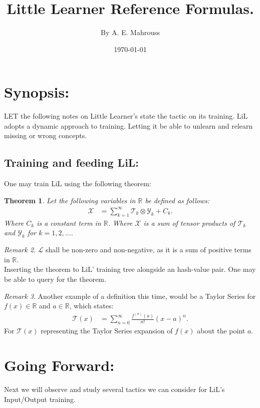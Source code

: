 \documentclass[10pt]{article}
\title{%
	\vspace{-1.5em}%
	\large\textbf{Little Learner Reference Formulas.}%
}
\author{By A. E. Mahrouss}
\date{\today}
\theoremstyle{plain}
\newtheorem{theorem}{Theorem}[section]
\theoremstyle{definition}
\theoremstyle{remark}
\newtheorem{remark}[theorem]{Remark}
\begin{document}

\maketitle
\tableofcontents
\newpage

\section{Synopsis:}

\lettrine[lines=1, lhang=0.1, loversize=0.2]{L}ET the following notes on Little Learner's state the tactic on its training. LiL adopts a dynamic approach to training. Letting it be able to unlearn and relearn missing or wrong concepts.

\subsection{Training and feeding LiL:}

One may train LiL using the following theorem:

\begin{theorem}
Let the following variables in $\mathbb{R}$ be defined as follows:
\begin{align*}
    \mathcal{X} &= \sum_{k=1}^{\infty} \mathcal{T}_k \otimes \mathcal{Y}_k + C_k.
\end{align*}
Where $C_k$ is a constant term in $\mathbb{R}$. Where $\mathcal{X}$ is a sum of tensor products of $\mathcal{T}_k$ and $\mathcal{Y}_k$ for $k=1,2,\ldots$.
\end{theorem}

\begin{remark}
    $\mathcal{L}$ shall be non-zero and non-negative, as it is a sum of positive terms in $\mathbb{R}$.\\
	Inserting the theorem to LiL' training tree alongside an hash-value pair. One may be able to query for the theorem.
\end{remark}

\begin{remark}
	Another example of a definition this time, would be a Taylor Series for $f(x) \in \mathbb{R}$ and $a \in \mathbb{R}$, which states:
	\begin{align*}
		\mathcal{T}(x) &= \sum_{n=0}^{\infty} \frac{f^{(n)}(a)}{n!} (x-a)^n.
	\end{align*}
	For $\mathcal{T}(x)$ representing the Taylor Series expansion of $f(x)$ about the point $a$.
\end{remark}

\section{Going Forward:}

Next we will observe and study several tactics we can consider for LiL's Input/Output training.

\nocite{*}



\end{document}
